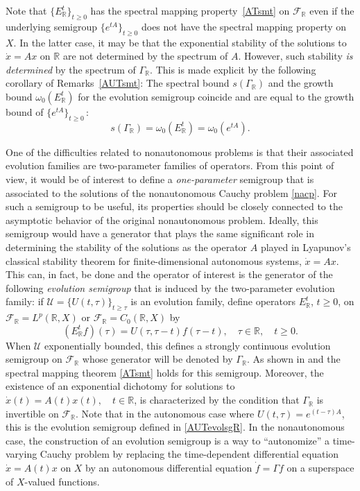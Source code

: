 \documentclass[10pt,psamsfonts,leqno]{siamltex}
\newcommand{\bbR}{\mathbb{R}}
\newcommand{\LpR}{{L^p(\bbR,X)}}
\newcommand{\U}{\mathcal{U}}
\begin{document}
\noindent Note that $\{E_\bbR^t\}_{t\ge0}$ has the spectral mapping
property~\eqref{ATsmt} on
$\mathcal{F}_\bbR$ even if the underlying semigroup
$\{e^{tA}\}_{t\ge0}$ does not have the spectral mapping property on
$X$.  In the latter case, it may be that the  exponential stability of
the solutions to $\dot x=Ax$ on $\bbR$ are not determined by the
spectrum of $A$.  However,  such stability {\em is determined} by the
spectrum of $\Gamma_\bbR$.  This is made explicit by the following
corollary of Remarks~\ref{AUTsmt}: The spectral bound
$s(\Gamma_\bbR)$ and the growth bound
$\omega_0(E_\bbR^t)$
for the evolution semigroup coincide and are equal to the growth bound
of   $\{e^{tA}\}_{t\ge0}$\,:
\begin{equation*}\label{GSbounds}
s(\Gamma_\bbR)=\omega_0(E_\bbR^t)=\omega_0(e^{tA}).
\end{equation*}

One of the difficulties related to nonautonomous problems is that their
associated evolution families are two-parameter families of
operators. From this point of view, it would be of interest to define a
{\em
one-parameter} semigroup that is associated to the solutions of the
nonautonomous Cauchy problem \eqref{nacp}.  For such a semigroup to be
useful, its properties should be closely connected to the asymptotic
behavior of the original nonautonomous problem.  Ideally, this semigroup
would have a generator that plays the same significant role in
determining the stability of the solutions as the operator $A$ played in
Lyapunov's classical stability theorem for finite-dimensional autonomous
systems, $\dot x=Ax$.  This can, in fact, be done and the operator of
interest is the generator of the following {\em evolution semigroup}
that is induced by the two-parameter evolution
family:  if $\U=\{U(t,\tau)\}_{t\ge\tau}$ is an
evolution family, define operators $E_\bbR^t$, $t\ge0$, on
 $\mathcal{F}_\bbR=\LpR$ or
$\mathcal{F}_\bbR=C_0(\bbR,X)$ by
\begin{equation}\label{TVevolsgR}
(E^t_\bbR f)(\tau) = U (\tau, \tau -t)f(\tau -t), \quad \tau\in \bbR,
\quad t\ge 0.
\end{equation}
When $\mathcal{U}$  exponentially bounded,
this defines a strongly continuous evolution semigroup on
$\mathcal{F}_\bbR$ whose generator will be denoted by $\Gamma_\bbR$.
As shown in \cite{LMS2} and \cite{RS1} the spectral mapping theorem
\eqref{ATsmt} holds for this semigroup.
Moreover, the existence of an exponential dichotomy for solutions to
$\dot{x}(t) = A(t)x(t),\quad t\in \bbR$,
is characterized by the condition that $\Gamma_\bbR$ is
invertible on $\mathcal{F}_\bbR$.   Note that in the autonomous case
where $U(t,\tau)=e^{(t-\tau)A}$, this is the evolution semigroup defined
in
\eqref{AUTevolsgR}.   In the nonautonomous case, the construction of
an evolution semigroup is a way to
 ``autonomize'' a time-varying Cauchy problem by replacing the
time-dependent differential equation $\dot{x}=A(t)x$ on $X$ by an
autonomous differential equation $\dot{f}=\Gamma f$ on a
superspace of $X$-valued functions.
\end{document}
